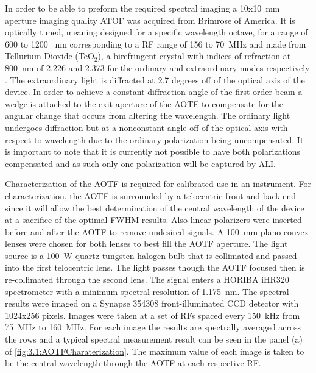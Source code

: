 \documentclass[12pt]{article}
\begin{document}
In order to be able to preform the required spectral imaging a 10x10~mm aperture imaging quality ATOF was acquired from Brimrose of America. It is optically tuned, meaning designed for a specific wavelength octave, for a range of 600 to 1200~ nm corresponding to a RF range of 156 to 70~MHz and made from Tellurium Dioxide (TeO$_{2}$), a birefringent crystal with indices of refraction at 800~nm of 2.226 and 2.373 for the ordinary and extraordinary modes respectively \citep{Uchida1971}. The extraordinary light is diffracted at 2.7 degrees off of the optical axis of the device. In order to achieve a constant diffraction angle of the first order beam a wedge is attached to the exit aperture of the AOTF to compensate for the angular change that occurs from altering the wavelength. The ordinary light undergoes diffraction but at a nonconstant angle off of the optical axis with respect to wavelength due to the ordinary polarization being uncompensated. It is important to note that it is currently not possible to have both polarizations compensated and as such only one polarization will be captured by ALI.

Characterization of the AOTF is required for calibrated use in an instrument. For characterization, the AOTF is surrounded by a telocentric front and back end since it will allow the best determination of the central wavelength of the device at a sacrifice of the optimal FWHM results. Also linear polarizers were inserted before and after the AOTF to remove undesired signals. A 100~mm plano-convex lenses were chosen for both lenses to best fill the AOTF aperture. The light source is a 100~W quartz-tungsten halogen bulb that is collimated and passed into the first telocentric lens. The light passes though the AOTF focused then is re-collimated through the second lens. The signal enters a HORIBA iHR320 spectrometer with a minimum spectral resolution of 1.175~nm. The spectral results were imaged on a Synapse 354308 front-illuminated CCD detector with 1024x256 pixels. Images were taken at a set of RFs spaced every 150~kHz from 75~MHz to 160~MHz. For each image the results are spectrally averaged across the rows and a typical spectral measurement result can be seen in the panel (a) of \autoref{fig:3.1:AOTFCharaterization}. The maximum value of each image is taken to be the central wavelength through the AOTF at each respective RF.
\end{document}
